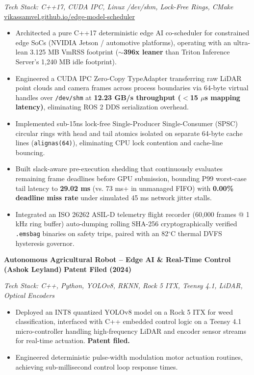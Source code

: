 \documentclass[10pt,a4paper]{article}
\newcommand{\resumeItem}[1]{\item{\small #1}}
\begin{document}
\small\textit{Tech Stack: C++17, CUDA IPC, Linux /dev/shm, Lock-Free Rings, CMake} \hfill \small\href{https://vikassamvel.github.io/edge-model-scheduler/}{vikassamvel.github.io/edge-model-scheduler}
\begin{itemize}
    \resumeItem{Architected a pure C++17 deterministic edge AI co-scheduler for constrained edge SoCs (NVIDIA Jetson / automotive platforms), operating with an ultra-lean 3.125 MB VmRSS footprint ($\sim$\textbf{396x leaner} than Triton Inference Server's 1,240 MB idle footprint).}
    \resumeItem{Engineered a CUDA IPC Zero-Copy TypeAdapter transferring raw LiDAR point clouds and camera frames across process boundaries via 64-byte virtual handles over \texttt{/dev/shm} at \textbf{12.23 GB/s throughput ($<$15 $\mu$s mapping latency)}, eliminating ROS 2 DDS serialization overhead.}
    \resumeItem{Implemented sub-15ns lock-free Single-Producer Single-Consumer (SPSC) circular rings with head and tail atomics isolated on separate 64-byte cache lines (\texttt{alignas(64)}), eliminating CPU lock contention and cache-line bouncing.}
    \resumeItem{Built slack-aware pre-execution shedding that continuously evaluates remaining frame deadlines before GPU submission, bounding P99 worst-case tail latency to \textbf{29.02 ms} (vs. 73 ms+ in unmanaged FIFO) with \textbf{0.00\% deadline miss rate} under simulated 45 ms network jitter stalls.}
    \resumeItem{Integrated an ISO 26262 ASIL-D telemetry flight recorder (60,000 frames @ 1 kHz ring buffer) auto-dumping rolling SHA-256 cryptographically verified \texttt{.emsbag} binaries on safety trips, paired with an 82$^\circ$C thermal DVFS hysteresis governor.}
\end{itemize}

\vspace{1.5pt}
\small\textbf{Autonomous Agricultural Robot -- Edge AI \& Real-Time Control (Ashok Leyland)} \hfill \textbf{Patent Filed (2024)}

\small\textit{Tech Stack: C++, Python, YOLOv8, RKNN, Rock 5 ITX, Teensy 4.1, LiDAR, Optical Encoders}
\begin{itemize}
    \resumeItem{Deployed an INT8 quantized YOLOv8 model on a Rock 5 ITX for weed classification, interfaced with C++ embedded control logic on a Teensy 4.1 micro-controller handling high-frequency LiDAR and encoder sensor streams for real-time actuation. \textbf{Patent filed.}}
    \resumeItem{Engineered deterministic pulse-width modulation motor actuation routines, achieving sub-millisecond control loop response times.}
\end{itemize}
\end{document}
